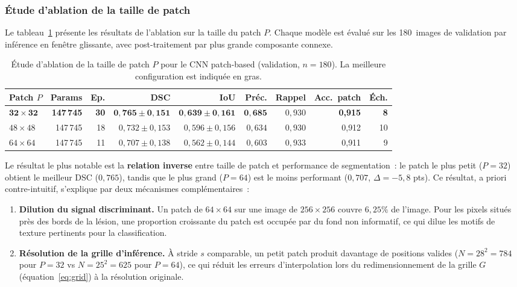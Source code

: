 \documentclass[12pt,a4paper]{article}
\begin{document}
\subsubsection{Étude d'ablation de la taille de patch}

Le tableau~\ref{tab:cnn_patch_ablation} présente les résultats de l'ablation sur la taille du patch $P$. Chaque modèle est évalué sur les 180~images de validation par inférence en fenêtre glissante, avec post-traitement par plus grande composante connexe.

\begin{table}[H]
\centering
\caption{Étude d'ablation de la taille de patch $P$ pour le CNN patch-based (validation, $n = 180$). La meilleure configuration est indiquée en gras.}
\label{tab:cnn_patch_ablation}
\footnotesize
\begin{tabular}{l r r r r r r r r}
\toprule
\textbf{Patch $P$} & \textbf{Params} & \textbf{Ep.} & \textbf{DSC} & \textbf{IoU} & \textbf{Préc.} & \textbf{Rappel} & \textbf{Acc.\ patch} & \textbf{Éch.} \\
\midrule
$\mathbf{32 \times 32}$ & \textbf{147\,745} & \textbf{30} & $\mathbf{0{,}765 \pm 0{,}151}$ & $\mathbf{0{,}639 \pm 0{,}161}$ & $\mathbf{0{,}685}$ & $0{,}930$ & \textbf{0{,}915} & \textbf{8} \\
$48 \times 48$ & 147\,745 & 18 & $0{,}732 \pm 0{,}153$ & $0{,}596 \pm 0{,}156$ & $0{,}634$ & $0{,}930$ & 0{,}912 & 10 \\
$64 \times 64$ & 147\,745 & 11 & $0{,}707 \pm 0{,}138$ & $0{,}562 \pm 0{,}144$ & $0{,}603$ & $0{,}933$ & 0{,}911 & 9 \\
\bottomrule
\end{tabular}
\end{table}

Le résultat le plus notable est la \textbf{relation inverse} entre taille de patch et performance de segmentation~: le patch le plus petit ($P = 32$) obtient le meilleur DSC ($0{,}765$), tandis que le plus grand ($P = 64$) est le moins performant ($0{,}707$, $\Delta = -5{,}8$ pts). Ce résultat, a priori contre-intuitif, s'explique par deux mécanismes complémentaires~:

\begin{enumerate}[nosep]
    \item \textbf{Dilution du signal discriminant.} Un patch de $64 \times 64$ sur une image de $256 \times 256$ couvre $6{,}25\%$ de l'image. Pour les pixels situés près des bords de la lésion, une proportion croissante du patch est occupée par du fond non informatif, ce qui dilue les motifs de texture pertinents pour la classification.
    \item \textbf{Résolution de la grille d'inférence.} À stride $s$ comparable, un petit patch produit davantage de positions valides ($N = 28^2 = 784$ pour $P = 32$ vs $N = 25^2 = 625$ pour $P = 64$), ce qui réduit les erreurs d'interpolation lors du redimensionnement de la grille $G$ (équation~\ref{eq:grid}) à la résolution originale.
\end{enumerate}
\end{document}
